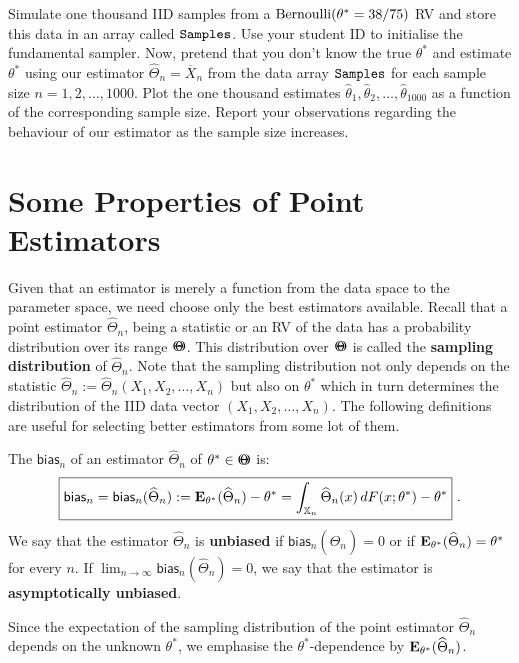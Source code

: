 \begin{labwork}\label{LW:1000CoinTossingExp}
Simulate one thousand IID samples from a $\mbox{{\rm Bernoulli}}(\theta^*=38/75)$ RV and store this data in an array called $\tt Samples$.  Use your student ID to initialise the fundamental sampler.  Now, pretend that you don't know the true $\theta^*$ and estimate $\theta^*$ using our estimator $\widehat{\Theta}_n=\overline{X}_n$ from the data array $\tt Samples$ for each sample size $n=1,2,\ldots,1000$.  Plot the one thousand estimates $\widehat{\theta}_1,\widehat{\theta}_2,\ldots,\widehat{\theta}_{1000}$ as a function of the corresponding sample size.  Report your observations regarding the behaviour of our estimator as the sample size increases.
\end{labwork}

\section{Some Properties of Point Estimators}\label{S:PropPointEstim}
Given that an estimator is merely a function from the data space to the parameter space, we need choose only the best estimators available.  Recall that a point estimator $\widehat{\Theta}_n$, being a statistic or an RV of the data has a probability distribution over its range ${\Theta}\mspace{-11 mu}{\Theta}$.  This distribution over ${\Theta}\mspace{-11 mu}{\Theta}$ is called the {\bf sampling distribution} of $\widehat{\Theta}_n$.  Note that the sampling distribution not only depends on the statistic $\widehat{\Theta}_n := \widehat{\Theta}_n(X_1,X_2,\ldots,X_n)$ but also on $\theta^*$ which in turn determines the distribution of the IID data vector $(X_1,X_2,\ldots,X_n)$.  The following definitions are useful for selecting better estimators from some lot of them.

\begin{definition}\label{D:Bias}
The $\mathsf{bias}_n$ of an estimator $\widehat{\Theta}_n$ of  $\theta^* \in {\Theta}\mspace{-11 mu}{\Theta}$ is:
\begin{equation}\label{E:Bias}
\boxed{
\mathsf{bias}_n=\mathsf{bias}_n(\widehat{\Theta}_n) := \mathbf{E}_{\theta^*}(\widehat{\Theta}_n) - \theta^* = \int_{\mathbb{X}_n} \widehat{\Theta}_n(x) \, dF(x;\theta^*) - \theta^*
}
 \ .
\end{equation} 
We say that the estimator $\widehat{\Theta}_n$ is {\bf unbiased} if $\mathsf{bias}_n(\widehat{\Theta}_n)=0$ or if $\mathbf{E}_{\theta^*}(\widehat{\Theta}_n)=\theta^*$ for every $n$.  If $\lim_{n \to \infty}\mathsf{bias}_n(\widehat{\Theta}_n)=0$, we say that the estimator is {\bf asymptotically unbiased}.
\end{definition}
Since the expectation of the sampling distribution of the point estimator $\widehat{\Theta}_n$ depends on the unknown $\theta^*$, we emphasise the $\theta^*$-dependence by $\mathbf{E}_{\theta^*}(\widehat{\Theta}_n)$.

